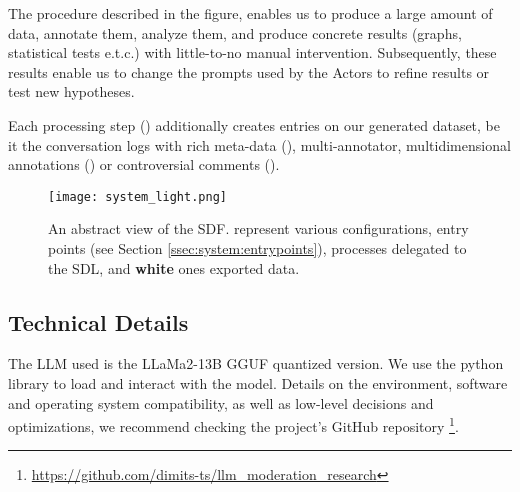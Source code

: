 The procedure described in the figure, enables us to produce a large amount of data, annotate them, analyze them, and produce concrete results (graphs, statistical tests e.t.c.) with little-to-no manual intervention. Subsequently, these results enable us to change the prompts used by the Actors to refine results or test new hypotheses.

Each processing step () additionally creates entries on our generated dataset, be it the conversation logs with rich meta-data (), multi-annotator, multidimensional annotations () or controversial comments ().

\begin{figure}
	\centering
	\texttt{[image: system\_light.png]}
	\caption{An abstract view of the \ac{SDF}.  represent various configurations,  entry points (see Section \ref{ssec:system:entrypoints}),  processes delegated to the \ac{SDL}, and \textbf{white} ones exported data.}
	\label{fig::system}
\end{figure}



\subsection{Technical Details}
\label{ssec:system:details}

The LLM used is the LLaMa2-13B GGUF quantized version. We use the  python library to load and interact with the model. Details on the environment, software and operating system compatibility, as well as low-level decisions and optimizations, we recommend checking the project's GitHub repository \footnote{\url{https://github.com/dimits-ts/llm_moderation_research}}.

